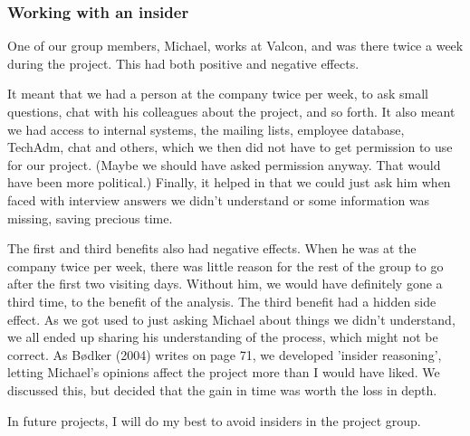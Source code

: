 \subsubsection{Working with an insider}
One of our group members, Michael, works at Valcon, and was there twice a week during the project.
This had both positive and negative effects.

It meant that we had a person at the company twice per week, to ask small questions, chat with his colleagues about the project, and so forth.
It also meant we had access to internal systems, the mailing lists, employee database, TechAdm, chat and others, which we then did not have to get permission to use for our project.
(Maybe we should have asked permission anyway. That would have been more political.)
Finally, it helped in that we could just ask him when faced with interview answers we didn't understand or some information was missing, saving precious time.

The first and third benefits also had negative effects.
When he was at the company twice per week, there was little reason for the rest of the group to go after the first two visiting days.
Without him, we would have definitely gone a third time, to the benefit of the analysis.
The third benefit had a hidden side effect.
As we got used to just asking Michael about things we didn't understand, we all ended up sharing his understanding of the process, which might not be correct.
As Bødker (2004) writes on page 71, we developed 'insider reasoning', letting Michael's opinions affect the project more than I would have liked.
We discussed this, but decided that the gain in time was worth the loss in depth.

In future projects, I will do my best to avoid insiders in the project group.